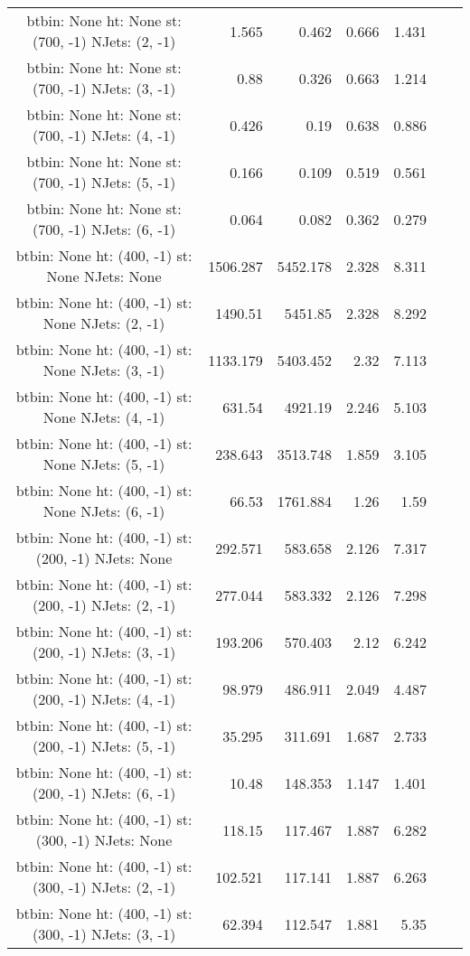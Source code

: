 \documentclass[12pt]{paper}
\begin{document}
\begin{landscape}
\begin{longtable}{c|r|r|r|r|r|r}
btbin:  None ht:  None st:  (700, -1) NJets:  (2, -1)
 & 1.565 & 0.462 & 0.666 & 1.431\\
btbin:  None ht:  None st:  (700, -1) NJets:  (3, -1)
 & 0.88 & 0.326 & 0.663 & 1.214\\
btbin:  None ht:  None st:  (700, -1) NJets:  (4, -1)
 & 0.426 & 0.19 & 0.638 & 0.886\\
btbin:  None ht:  None st:  (700, -1) NJets:  (5, -1)
 & 0.166 & 0.109 & 0.519 & 0.561\\
btbin:  None ht:  None st:  (700, -1) NJets:  (6, -1)
 & 0.064 & 0.082 & 0.362 & 0.279\\
btbin:  None ht:  (400, -1) st:  None NJets:  None
 & 1506.287 & 5452.178 & 2.328 & 8.311\\
btbin:  None ht:  (400, -1) st:  None NJets:  (2, -1)
 & 1490.51 & 5451.85 & 2.328 & 8.292\\
btbin:  None ht:  (400, -1) st:  None NJets:  (3, -1)
 & 1133.179 & 5403.452 & 2.32 & 7.113\\
btbin:  None ht:  (400, -1) st:  None NJets:  (4, -1)
 & 631.54 & 4921.19 & 2.246 & 5.103\\
btbin:  None ht:  (400, -1) st:  None NJets:  (5, -1)
 & 238.643 & 3513.748 & 1.859 & 3.105\\
btbin:  None ht:  (400, -1) st:  None NJets:  (6, -1)
 & 66.53 & 1761.884 & 1.26 & 1.59\\
btbin:  None ht:  (400, -1) st:  (200, -1) NJets:  None
 & 292.571 & 583.658 & 2.126 & 7.317\\
btbin:  None ht:  (400, -1) st:  (200, -1) NJets:  (2, -1)
 & 277.044 & 583.332 & 2.126 & 7.298\\
btbin:  None ht:  (400, -1) st:  (200, -1) NJets:  (3, -1)
 & 193.206 & 570.403 & 2.12 & 6.242\\
btbin:  None ht:  (400, -1) st:  (200, -1) NJets:  (4, -1)
 & 98.979 & 486.911 & 2.049 & 4.487\\
btbin:  None ht:  (400, -1) st:  (200, -1) NJets:  (5, -1)
 & 35.295 & 311.691 & 1.687 & 2.733\\
btbin:  None ht:  (400, -1) st:  (200, -1) NJets:  (6, -1)
 & 10.48 & 148.353 & 1.147 & 1.401\\
btbin:  None ht:  (400, -1) st:  (300, -1) NJets:  None
 & 118.15 & 117.467 & 1.887 & 6.282\\
btbin:  None ht:  (400, -1) st:  (300, -1) NJets:  (2, -1)
 & 102.521 & 117.141 & 1.887 & 6.263\\
btbin:  None ht:  (400, -1) st:  (300, -1) NJets:  (3, -1)
 & 62.394 & 112.547 & 1.881 & 5.35\\

\end{longtable}
\end{landscape}
\end{document}
